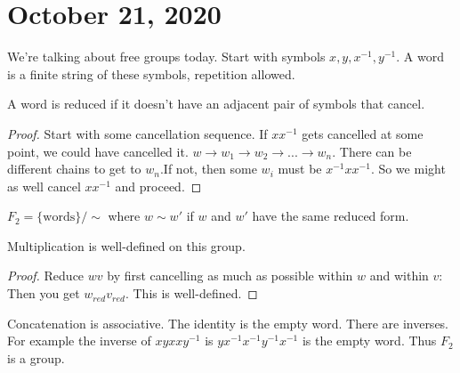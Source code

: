 \documentclass{article}
\newcommand{\ra}[1][]{\xrightarrow{#1}}
\begin{document}
\section{October 21, 2020}
We're talking about free groups today. Start with symbols $x,y,x^{-1},y^{-1}$. A word is a finite string of these symbols, repetition allowed.
\begin{definition}
A word is reduced if it doesn't have an adjacent pair of symbols that cancel.
\end{definition}
\begin{proof}
Start with some cancellation sequence. If $xx^{-1}$ gets cancelled at some point, we could have cancelled it. $w\ra w_1\ra w_2\ra...\ra w_n$. There can be different chains to get to $w_n$.If not, then some $w_i$ must be $x^{-1}xx^{-1}$. So we might as well cancel $xx^{-1}$ and proceed.
\end{proof}
\begin{definition}
$F_2=\{\textrm{words}\}/\sim$ where $w\sim w'$ if $w$ and $w'$ have the same reduced form.
\end{definition}
Multiplication is well-defined on this group.
\begin{proof}
Reduce $wv$ by first cancelling as much as possible within $w$ and within $v$: Then you get $w_{red}v_{red}$. This is well-defined.
\end{proof}
Concatenation is associative. The identity is the empty word. There are inverses. For example the inverse of $xyxxy^{-1}$ is $yx^{-1}x^{-1}y^{-1}x^{-1}$ is the empty word. Thus $F_2$ is a group.
\end{document}
